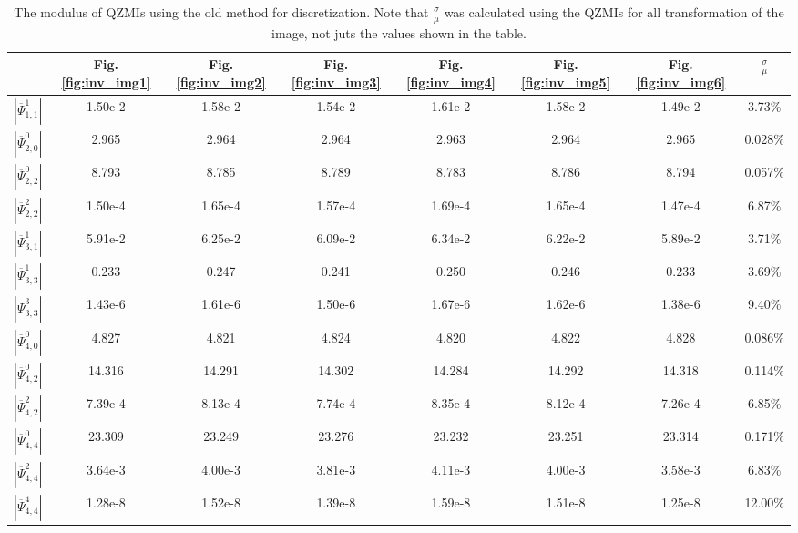 \begin{table}
	\centering
\begin{tabular}{| c || c | c | c | c | c | c || c | } \hline
& Fig.\ref{fig:inv_img1} & Fig.\ref{fig:inv_img2} & Fig.\ref{fig:inv_img3} & Fig.\ref{fig:inv_img4} & Fig.\ref{fig:inv_img5} & Fig.\ref{fig:inv_img6} & $\frac{\sigma}{\mu}$ \\ \hline\hline
$|\overline{\Psi}_{1,1}^1|$ & 1.50e-2 & 1.58e-2 & 1.54e-2 & 1.61e-2 & 1.58e-2 & 1.49e-2 & 3.73\% \\ \hline
$|\overline{\Psi}_{2,0}^0|$ & 2.965 & 2.964 & 2.964 & 2.963 & 2.964 & 2.965 & 0.028\% \\ \hline
$|\overline{\Psi}_{2,2}^0|$ & 8.793 & 8.785 & 8.789 & 8.783 & 8.786 & 8.794 & 0.057\% \\ \hline
$|\overline{\Psi}_{2,2}^2|$ & 1.50e-4 & 1.65e-4 & 1.57e-4 & 1.69e-4 & 1.65e-4 & 1.47e-4 & 6.87\% \\ \hline
$|\overline{\Psi}_{3,1}^1|$ & 5.91e-2 & 6.25e-2 & 6.09e-2 & 6.34e-2 & 6.22e-2 & 5.89e-2 & 3.71\%  \\ \hline
$|\overline{\Psi}_{3,3}^1|$ & 0.233 & 0.247 & 0.241 & 0.250 & 0.246 & 0.233 & 3.69\% \\ \hline
$|\overline{\Psi}_{3,3}^3|$ & 1.43e-6 & 1.61e-6 & 1.50e-6 & 1.67e-6 & 1.62e-6 & 1.38e-6 & 9.40\% \\ \hline
$|\overline{\Psi}_{4,0}^0|$ & 4.827 & 4.821 & 4.824 & 4.820 & 4.822 & 4.828 & 0.086\% \\ \hline
$|\overline{\Psi}_{4,2}^0|$ & 14.316 & 14.291 & 14.302 & 14.284 & 14.292 & 14.318 & 0.114\% \\ \hline
$|\overline{\Psi}_{4,2}^2|$ & 7.39e-4 & 8.13e-4 & 7.74e-4 & 8.35e-4 & 8.12e-4 & 7.26e-4 & 6.85\% \\ \hline
$|\overline{\Psi}_{4,4}^0|$ & 23.309 & 23.249 & 23.276 & 23.232 & 23.251 & 23.314 & 0.171\% \\ \hline
$|\overline{\Psi}_{4,4}^2|$ & 3.64e-3 & 4.00e-3 & 3.81e-3 & 4.11e-3 & 4.00e-3 & 3.58e-3 & 6.83\% \\ \hline
$|\overline{\Psi}_{4,4}^4|$ & 1.28e-8 & 1.52e-8 & 1.39e-8 & 1.59e-8 & 1.51e-8 & 1.25e-8 & 12.00\% \\ \hline
\end{tabular}
\caption{The modulus of QZMIs using the old method for discretization. Note that $\frac{\sigma}{\mu}$ was calculated using the QZMIs for all transformation of the image, not juts the values shown in the table.}
\label{tab:inv_old}
\end{table}

